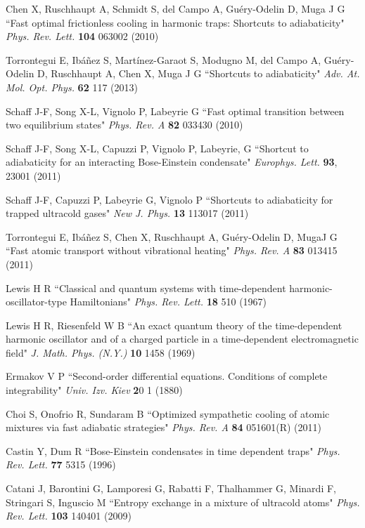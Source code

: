 \documentclass[pra,letterpaper,twocolumn,showpacs,superscriptaddress]{revtex4}
\begin{document}
\begin{thebibliography}{300}
 Chen X, Ruschhaupt A, Schmidt S, del Campo A, Gu\'ery-Odelin D, Muga J G 
``Fast optimal frictionless cooling in harmonic traps: Shortcuts to adiabaticity"
{\it Phys. Rev. Lett.} \textbf{104} 063002 (2010)

 Torrontegui E, Ib\'a\~nez S, Mart\'inez-Garaot S, Modugno M, del Campo A, Gu\'ery-Odelin D, Ruschhaupt A, Chen X, Muga J G
``Shortcuts to adiabaticity" {\it Adv. At. Mol. Opt. Phys.} \textbf{62} 117 (2013)

 Schaff J-F, Song X-L, Vignolo P, Labeyrie G
``Fast optimal transition between two equilibrium states" {\it Phys. Rev. A} \textbf{82} 033430 (2010) 

 Schaff J-F, Song X-L, Capuzzi P, Vignolo P, Labeyrie, G
``Shortcut to adiabaticity for an interacting Bose-Einstein condensate"
{\it Europhys. Lett.} \textbf{93}, 23001 (2011)

 Schaff J-F, Capuzzi P, Labeyrie G, Vignolo P
``Shortcuts to adiabaticity for trapped ultracold gases" {\it New J. Phys.} \textbf{13} 113017 (2011)

 Torrontegui E, Ib\'a\~nez S, Chen X, Ruschhaupt A, Gu\'ery-Odelin D, MugaJ G 
``Fast atomic transport without vibrational heating"
{\it Phys. Rev. A} \textbf{83} 013415 (2011)

 Lewis H R
``Classical and quantum systems with time-dependent harmonic-oscillator-type Hamiltonians"
{\it Phys. Rev. Lett.} \textbf{18} 510 (1967)

 Lewis H R, Riesenfeld W B 
``An exact quantum theory of the time-dependent harmonic oscillator and of a charged 
particle in a time-dependent electromagnetic field" 
{\it J. Math. Phys. (N.Y.)} \textbf{10} 1458 (1969)

 Ermakov V P ``Second-order differential equations. Conditions of complete integrability" 
{\it Univ. Izv. Kiev} {\textbf 20} 1 (1880)

 Choi S, Onofrio R, Sundaram B 
``Optimized sympathetic cooling of atomic mixtures via fast adiabatic strategies"
{\it Phys. Rev. A} \textbf{84} 051601(R) (2011)

 Castin Y, Dum R ``Bose-Einstein condensates in time dependent traps"
{\it Phys. Rev. Lett.} \textbf{77} 5315 (1996)

 Catani J, Barontini G, Lamporesi G, Rabatti F, Thalhammer G, Minardi F, Stringari S, Inguscio M
``Entropy exchange in a mixture of ultracold atoms" {\it Phys. Rev. Lett.} \textbf{103} 140401 (2009)


\end{thebibliography}
\end{document}
